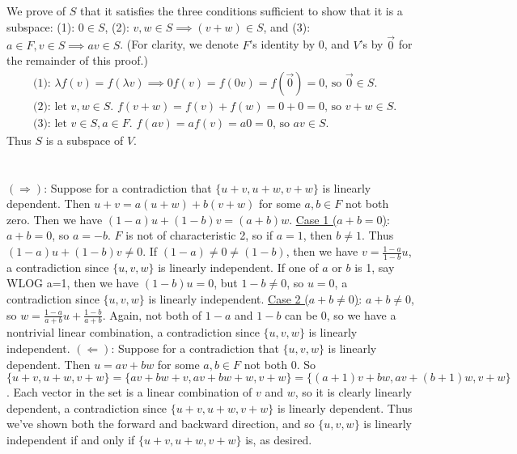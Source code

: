 \documentclass[11pt]{article}
\begin{document}
\section{} %
We prove of $S$ that it satisfies the three conditions sufficient to show that
it is a subspace: (1): $0\in S$, (2): $v,w\in S\implies(v+w)\in S$, and
(3): $a\in F,v\in S\implies av\in S$. (For clarity, we denote $F$'s identity
by 0, and $V$'s by $\vec0$ for the remainder of this proof.)
\begin{align*}
	&\text{(1): } \lambda f(v)=f(\lambda v)\implies 0f(v)=f(0v)=f(\vec 0)=0\text{, so $\vec0\in S$.}\\
	&\text{(2): let $v,w\in S$. } f(v+w)=f(v)+f(w)=0+0=0\text{, so $v+w\in S$.}\\
	&\text{(3): let $v\in S,a\in F$. } f(av)=af(v)=a0=0\text{, so $av\in S$.}
\end{align*}
Thus $S$ is a subspace of $V$.


\section{} %
$(\Longrightarrow)$: Suppose for a contradiction that $\{u+v,u+w,v+w\}$ is
linearly dependent. Then $u+v=a(u+w)+b(v+w)$ for some $a,b\in F$ not both zero.
Then we have $(1-a)u+(1-b)v=(a+b)w$.
\newline
\newline
\underline{Case 1 ($a+b=0$)}: $a+b=0$, so $a=-b$. $F$ is not of characteristic
2, so if $a=1$, then $b\neq1$. Thus $(1-a)u+(1-b)v\neq0$. If
$(1-a)\neq0\neq(1-b)$, then we have $v=\frac{1-a}{1-b}u$, a contradiction since
$\{u,v,w\}$ is linearly independent. If one of $a$ or $b$ is 1, say WLOG a=1,
then we have $(1-b)u=0$, but $1-b\neq0$, so $u=0$, a contradiction since
$\{u,v,w\}$ is linearly independent.
\newline
\newline
\underline{Case 2 ($a+b\neq0$)}: $a+b\neq0$, so
$w=\frac{1-a}{a+b}u+\frac{1-b}{a+b}$. Again, not both of $1-a$ and $1-b$ can be
0, so we have a nontrivial linear combination, a contradiction since
$\{u,v,w\}$ is linearly independent.
\newline
\newline
$(\Longleftarrow)$: Suppose for a contradiction that $\{u,v,w\}$ is linearly
dependent. Then $u=av+bw$ for some $a,b\in F$ not both 0. So
$\{u+v,u+w,v+w\}=\{av+bw+v,av+bw+w,v+w\}=\{(a+1)v+bw,av+(b+1)w,v+w\}$. Each
vector in the set is a linear combination of $v$ and $w$, so it is clearly
linearly dependent, a contradiction since $\{u+v,u+w,v+w\}$ is linearly
dependent.
\newline
\newline
Thus we've shown both the forward and backward direction, and so $\{u,v,w\}$
is linearly independent if and only if $\{u+v,u+w,v+w\}$ is, as desired.
\end{document}
